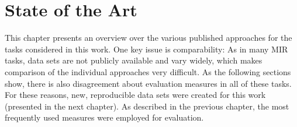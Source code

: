 

\chapter{State of the Art}	\label{chap:sota}
This chapter presents an overview over the various published approaches for the tasks considered in this work. One key issue is comparability: As in many MIR tasks, data sets are not publicly available and vary widely, which makes  comparison of the individual approaches very difficult. As the following sections show, there is also disagreement about evaluation measures in all of these tasks.\\

For these reasons, new, reproducible data sets were created for this work (presented in the next chapter). As described in the previous chapter, the most frequently used measures were employed for evaluation.

